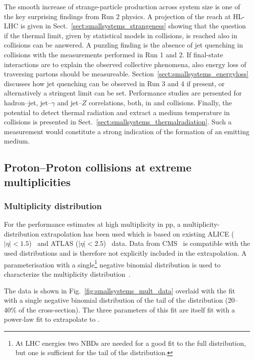 \documentclass[../report.tex]{subfiles}
\begin{document}
The smooth increase of strange-particle production across system size is one of the key surprising findings from Run 2 \pp physics. A projection of the reach at HL-LHC is given in Sect.~\ref{sect:smallsystems_strangeness} showing that the question if the thermal limit, given by statistical models in \PbPb collisions, is reached also in \pp collisions can be answered.
A puzzling finding is the absence of jet quenching in \pPb collisions with the measurements performed in Run 1 and 2. If final-state interactions are to explain the observed collective phenomena, also energy loss of traversing partons should be measureable. 
Section~\ref{sect:smallsystems_energyloss} discusses how jet quenching can be observed in Run 3 and 4 if present, or alternatively a stringent limit can be set. Performance studies are persented for hadron--jet, jet--$\gamma$ and jet--$Z$ correlations, both, in \pPb and \pp collisions.
Finally, the potential to detect thermal radiation and extract a medium temperature in \pPb collisions is presented in Sect.~\ref{sect:smallsystems_thermalradiation}. Such a measurement would constitute a strong indication of the formation of an emitting medium. 

\subsection{Proton--Proton collisions at extreme multiplicities}
\label{sect:smallsystems_multiplicity}

\subsubsection{Multiplicity distribution}

For the performance estimates at high multiplicity in pp, a multiplicity-distribution extrapolation has been used which is based on existing ALICE ($|\eta| < 1.5$)~\cite{Adam:2015gka} and ATLAS ($|\eta|< 2.5$)~\cite{Aad:2010ac,Aad:2016xww} data. Data from CMS~\cite{Khachatryan:2010nk} is compatible with the used distributions and is therefore not explicitly included in the extrapolation. A parameterisation with a single\footnote{At LHC energies two NBDs are needed for a good fit to the full distribution, but one is sufficient for the tail of the distribution.} negative binomial distribution is used to characterize the multiplicity distribution~\cite{GrosseOetringhaus:2009kz,ALICE:2017pcy}.

The data is shown in Fig.~\ref{fig:smallsystems_mult_data} overlaid with the fit with a single negative binomial distribution of the tail of the distribution (20--40\% of the cross-section). The three parameters of this fit are itself fit with a power-law fit to extrapolate to \unit[14]{\UTeV}.
\end{document}
